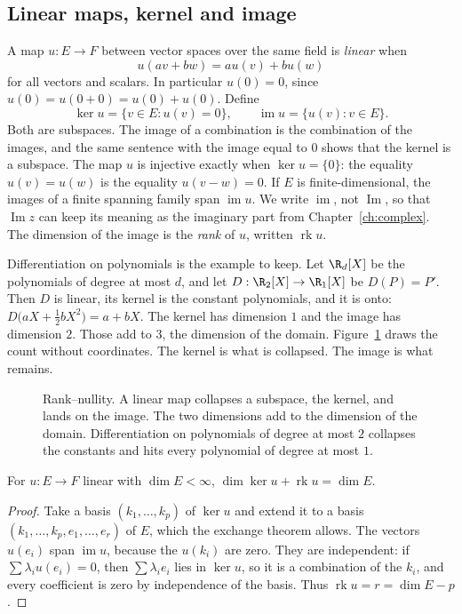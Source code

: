 \subsection*{Linear maps, kernel and image}

A map $u:E\to F$ between vector spaces over the same field is \emph{linear} when
\[
u(av+bw)=au(v)+bu(w)
\]
for all vectors and scalars. In particular $u(0)=0$, since $u(0)=u(0+0)=u(0)+u(0)$. Define
\[
\ker u=\{v\in E:u(v)=0\},\qquad \operatorname{im}u=\{u(v):v\in E\}.
\]
Both are subspaces. The image of a combination is the combination of the images, and the same sentence with the image equal to $0$ shows that the kernel is a subspace. The map $u$ is injective exactly when $\ker u=\{0\}$: the equality $u(v)=u(w)$ is the equality $u(v-w)=0$. If $E$ is finite-dimensional, the images of a finite spanning family span $\operatorname{im}u$. We write $\operatorname{im}$, not $\operatorname{Im}$, so that $\operatorname{Im}z$ can keep its meaning as the imaginary part from Chapter~\ref{ch:complex}. The dimension of the image is the \emph{rank} of $u$, written $\operatorname{rk}u$.

Differentiation on polynomials is the example to keep. Let $\R_d[X]$ be the polynomials of degree at most $d$, and let $D:\R_2[X]\to\R_1[X]$ be $D(P)=P'$. Then $D$ is linear, its kernel is the constant polynomials, and it is onto: $D\bigl(aX+\frac12 bX^2\bigr)=a+bX$. The kernel has dimension $1$ and the image has dimension $2$. Those add to $3$, the dimension of the domain. Figure~\ref{fig:rank} draws the count without coordinates. The kernel is what is collapsed. The image is what remains.

\begin{figure}[ht]
\centering
{}
\caption{Rank--nullity. A linear map collapses a subspace, the kernel, and lands on the image. The two dimensions add to the dimension of the domain. Differentiation on polynomials of degree at most $2$ collapses the constants and hits every polynomial of degree at most $1$.}
\label{fig:rank}
\end{figure}

\begin{proposition}\label{prop:ranknullity}
For $u:E\to F$ linear with $\dim E<\infty$, $\dim\ker u+\operatorname{rk}u=\dim E$.
\end{proposition}
\begin{proof}
Take a basis $(k_1,\dots,k_p)$ of $\ker u$ and extend it to a basis $(k_1,\dots,k_p,e_1,\dots,e_r)$ of $E$, which the exchange theorem allows. The vectors $u(e_i)$ span $\operatorname{im}u$, because the $u(k_i)$ are zero. They are independent: if $\sum\lambda_iu(e_i)=0$, then $\sum\lambda_ie_i$ lies in $\ker u$, so it is a combination of the $k_i$, and every coefficient is zero by independence of the basis. Thus $\operatorname{rk}u=r=\dim E-p$.
\end{proof}


